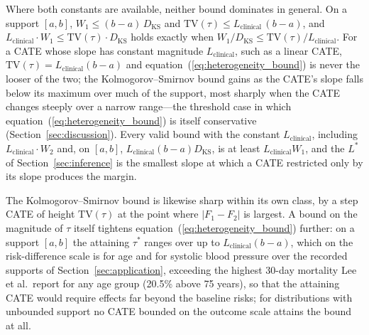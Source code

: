 \documentclass[AMA,Times1COL]{WileyNJDv5}
\begin{document}
Where both constants are available, neither bound dominates in general. On a support $[a, b]$, $W_1 \leq (b - a)\,D_{\text{KS}}$ and $\mathrm{TV}(\tau) \leq L_{\text{clinical}}\,(b - a)$, and $L_{\text{clinical}} \cdot W_1 \leq \mathrm{TV}(\tau) \cdot D_{\text{KS}}$ holds exactly when $W_1 / D_{\text{KS}} \leq \mathrm{TV}(\tau) / L_{\text{clinical}}$. For a CATE whose slope has constant magnitude $L_{\text{clinical}}$, such as a linear CATE, $\mathrm{TV}(\tau) = L_{\text{clinical}}(b - a)$ and equation~(\ref{eq:heterogeneity_bound}) is never the looser of the two; the Kolmogorov--Smirnov bound gains as the CATE's slope falls below its maximum over much of the support, most sharply when the CATE changes steeply over a narrow range---the threshold case in which equation~(\ref{eq:heterogeneity_bound}) is itself conservative (Section~\ref{sec:discussion}). Every valid bound with the constant $L_{\text{clinical}}$, including $L_{\text{clinical}} \cdot W_2$ and, on $[a, b]$, $L_{\text{clinical}} (b - a) D_{\text{KS}}$, is at least $L_{\text{clinical}} W_1$, and the $L^*$ of Section~\ref{sec:inference} is the smallest slope at which a CATE restricted only by its slope produces the margin.

The Kolmogorov--Smirnov bound is likewise sharp within its own class, by a step CATE of height $\mathrm{TV}(\tau)$ at the point where $|F_1 - F_2|$ is largest. A bound on the magnitude of $\tau$ itself tightens equation~(\ref{eq:heterogeneity_bound}) further: on a support $[a, b]$ the attaining $\tau^*$ ranges over up to $L_{\text{clinical}} (b - a)$, which on the risk-difference scale is  for age and  for systolic blood pressure over the recorded supports of Section~\ref{sec:application}, exceeding the highest 30-day mortality Lee et al.\ report for any age group (20.5\% above 75 years\cite{lee1995}), so that the attaining CATE would require effects far beyond the baseline risks; for distributions with unbounded support no CATE bounded on the outcome scale attains the bound at all.

\end{document}
